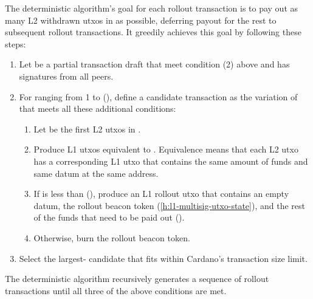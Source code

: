 \documentclass[../hydrozoa.tex]{subfiles}
\begin{document}
The deterministic algorithm's goal for each rollout transaction is to pay out as many L2 withdrawn utxos in  as possible, deferring payout for the rest to subsequent rollout transactions.
It greedily achieves this goal by following these steps:
\begin{enumerate}
  \item Let  be a partial transaction draft that meet condition (2) above and has signatures from all peers.
  \item For  ranging from 1 to (), define a candidate transaction as the variation of  that meets all these additional conditions:
    \begin{enumerate}
      \item Let  be the first  L2 utxos in .
      \item Produce L1 utxos equivalent to .
        Equivalence means that each L2 utxo has a corresponding L1 utxo that contains the same amount of funds and same datum at the same address.
      \item If  is less than (), produce an L1 rollout utxo that contains an empty datum, the rollout beacon token (\cref{h:l1-multisig-utxo-state}), and the rest of the funds that need to be paid out
        ().
      \item Otherwise, burn the rollout beacon token.
    \end{enumerate}
  \item Select the largest- candidate that fits within Cardano's transaction size limit.
\end{enumerate}

The deterministic algorithm recursively generates a sequence of rollout transactions until all three of the above conditions are met.
\end{document}
